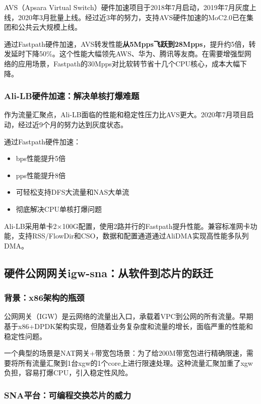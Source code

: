 AVS（Apsara Virtual Switch）硬件加速项目于2018年7月启动，2019年7月灰度上线，2020年3月批量上线。经过近3年的努力，支持AVS硬件加速的MoC2.0已在集团和公共云大规模上线。

通过Fastpath硬件加速，AVS转发性能\textbf{从5Mpps飞跃到28Mpps}，提升约5倍，转发延时下降50\%。这个性能大幅领先AWS、华为、腾讯等友商。在需要增强型网络的应用场景，Fastpath的30Mpps对比软转节省十几个CPU核心，成本大幅下降。

\subsubsection{Ali-LB硬件加速：解决单核打爆难题}

作为流量汇聚点，Ali-LB面临的性能和稳定性压力比AVS更大。2020年7月项目启动，经过近9个月的努力达到灰度状态。

通过Fastpath硬件加速：
\begin{itemize}
    \item bps性能提升5倍
    \item pps性能提升8倍
    \item 可轻松支持DFS大流量和NAS大单流
    \item 彻底解决CPU单核打爆问题
\end{itemize}

Ali-LB采用单卡2×100G配置，使用2路并行的Fastpath提升性能。兼容标准网卡功能，支持RSS/FlowDir和CSO，数据和配置通道通过AliDMA实现高性能多队列DMA。

\subsection{硬件公网网关igw-sna：从软件到芯片的跃迁}

\subsubsection{背景：x86架构的瓶颈}

公网网关（IGW）是云网络的流量出入口，承载着VPC到公网的所有流量。早期基于x86+DPDK架构实现，但随着业务复杂度和流量的增长，面临严重的性能和稳定性问题。

一个典型的场景是NAT网关+带宽包场景：为了给200M带宽包进行精确限速，需要将所有流量汇聚到1台xgw的1个core上进行限速处理。这种流量汇聚加重了xgw负担，容易打爆CPU，引入稳定性风险。

\subsubsection{SNA平台：可编程交换芯片的威力}

